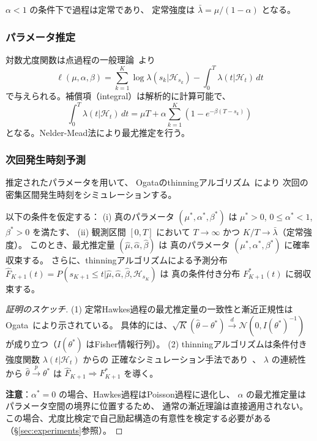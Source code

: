 $\alpha < 1$ の条件下で過程は定常であり、
定常強度は $\bar{\lambda} = \mu / (1 - \alpha)$ となる。

\subsubsection{パラメータ推定}

対数尤度関数は点過程の一般理論~\cite{daley2003introduction}より
\begin{equation}\label{eq:loglikelihood}
  \ell(\mu, \alpha, \beta) = \sum_{k=1}^{K} \log \lambda(s_k|\mathcal{H}_{s_k}) - \int_0^T \lambda(t|\mathcal{H}_t) \, dt
\end{equation}
で与えられる。補償項（integral）は解析的に計算可能で、
\begin{equation}
  \int_0^T \lambda(t|\mathcal{H}_t) \, dt = \mu T + \alpha \sum_{k=1}^{K} \left(1 - e^{-\beta(T - s_k)}\right)
\end{equation}
となる。Nelder-Mead法により最尤推定を行う。

\subsubsection{次回発生時刻予測}

推定されたパラメータを用いて、
Ogataのthinningアルゴリズム~\cite{ogata1981lewis}により
次回の密集区間発生時刻をシミュレーションする。

\begin{proposition}[予測の一致性]\label{prop:consistency}
  以下の条件を仮定する：
  (i) 真のパラメータ $(\mu^*, \alpha^*, \beta^*)$ は $\mu^* > 0$, $0 \leq \alpha^* < 1$, $\beta^* > 0$ を満たす、
  (ii) 観測区間 $[0, T]$ において $T \to \infty$ かつ $K/T \to \bar{\lambda}$（定常強度）。
  このとき、最尤推定量 $(\hat{\mu}, \hat{\alpha}, \hat{\beta})$ は
  真のパラメータ $(\mu^*, \alpha^*, \beta^*)$ に確率収束する。
  さらに、thinningアルゴリズムによる予測分布
  $\hat{F}_{K+1}(t) = P(s_{K+1} \leq t | \hat{\mu}, \hat{\alpha}, \hat{\beta}, \mathcal{H}_{s_K})$ は
  真の条件付き分布 $F^*_{K+1}(t)$ に弱収束する。
\end{proposition}

\begin{proof}[証明のスケッチ]
  (1) 定常Hawkes過程の最尤推定量の一致性と漸近正規性は
  Ogata~\cite{ogata1978asymptotic}により示されている。
  具体的には、$\sqrt{K}(\hat{\theta} - \theta^*) \xrightarrow{d} \mathcal{N}(0, I(\theta^*)^{-1})$
  が成り立つ（$I(\theta^*)$ はFisher情報行列）。
  (2) thinningアルゴリズムは条件付き強度関数 $\lambda(t|\mathcal{H}_t)$ からの
  正確なシミュレーション手法であり~\cite{ogata1981lewis}、
  $\lambda$ の連続性から
  $\hat{\theta} \xrightarrow{p} \theta^*$ は
  $\hat{F}_{K+1} \Rightarrow F^*_{K+1}$ を導く。

  \textbf{注意}：$\alpha^* = 0$ の場合、Hawkes過程はPoisson過程に退化し、
  $\alpha$ の最尤推定量はパラメータ空間の境界に位置するため、
  通常の漸近理論は直接適用されない。
  この場合、尤度比検定で自己励起構造の有意性を検定する必要がある（\S\ref{sec:experiments}参照）。
\end{proof}

